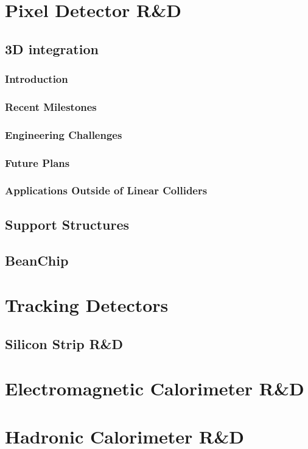 \documentclass[10pt]{article}
\begin{document}
\section{Pixel Detector R\&D}


\subsection{3D integration}
\subsubsection{Introduction}
\subsubsection{Recent Milestones}
\subsubsection{Engineering Challenges}
\subsubsection{Future Plans}
\subsubsection{Applications Outside of Linear Colliders}



\subsection{Support Structures}
\subsection{BeanChip}

\section{Tracking Detectors}
\subsection{Silicon Strip R\&D}



\section{Electromagnetic Calorimeter R\&D}


\section{Hadronic Calorimeter R\&D}


\end{document}
